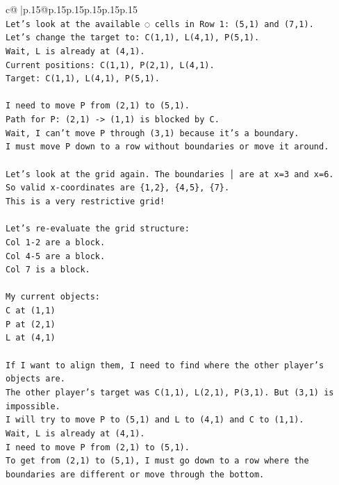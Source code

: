 \documentclass{article}
\begin{document}
{\begin{supertabular}{c@{$\;$}|p{.15\linewidth}@{}p{.15\linewidth}p{.15\linewidth}p{.15\linewidth}p{.15\linewidth}p{.15\linewidth}}
{{{\\ 
\texttt{Let's look at the available ◌ cells in Row 1: (5,1) and (7,1).} \\
\texttt{Let's change the target to: C(1,1), L(4,1), P(5,1).} \\
\texttt{Wait, L is already at (4,1).} \\
\texttt{Current positions: C(1,1), P(2,1), L(4,1).} \\
\texttt{Target: C(1,1), L(4,1), P(5,1).} \\
\\ 
\texttt{I need to move P from (2,1) to (5,1).} \\
\texttt{Path for P: (2,1) {-}> (1,1) is blocked by C.} \\
\texttt{Wait, I can't move P through (3,1) because it's a boundary.} \\
\texttt{I must move P down to a row without boundaries or move it around.} \\
\\ 
\texttt{Let's look at the grid again. The boundaries │ are at x=3 and x=6.} \\
\texttt{So valid x{-}coordinates are \{1,2\}, \{4,5\}, \{7\}.} \\
\texttt{This is a very restrictive grid!} \\
\\ 
\texttt{Let's re{-}evaluate the grid structure:} \\
\texttt{Col 1{-}2 are a block.} \\
\texttt{Col 4{-}5 are a block.} \\
\texttt{Col 7 is a block.} \\
\\ 
\texttt{My current objects:} \\
\texttt{C at (1,1)} \\
\texttt{P at (2,1)} \\
\texttt{L at (4,1)} \\
\\ 
\texttt{If I want to align them, I need to find where the other player's objects are.} \\
\texttt{The other player's target was C(1,1), L(2,1), P(3,1). But (3,1) is impossible.} \\
\texttt{I will try to move P to (5,1) and L to (4,1) and C to (1,1).} \\
\texttt{Wait, L is already at (4,1).} \\
\texttt{I need to move P from (2,1) to (5,1).} \\
\texttt{To get from (2,1) to (5,1), I must go down to a row where the boundaries are different or move through the bottom.} \\
}}}
\end{supertabular}}
\end{document}
